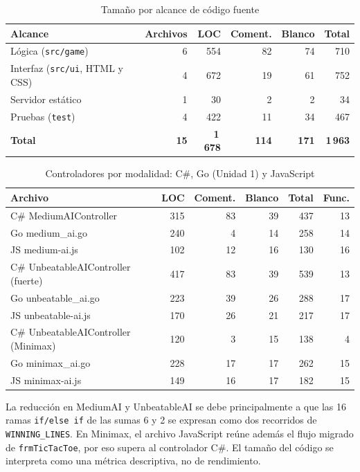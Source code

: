 \documentclass[12pt,a4paper]{article}
\begin{document}
\begin{table}[H]
\centering\small
\caption{Tamaño por alcance de código fuente}
\begin{tabular}{lrrrrr}
\toprule Alcance & Archivos & LOC & Coment. & Blanco & Total\\\midrule
Lógica (\texttt{src/game}) & 6 & 554 & 82 & 74 & 710\\
Interfaz (\texttt{src/ui}, HTML y CSS) & 4 & 672 & 19 & 61 & 752\\
Servidor estático & 1 & 30 & 2 & 2 & 34\\
Pruebas (\texttt{test}) & 4 & 422 & 11 & 34 & 467\\
\textbf{Total} & \textbf{15} & \textbf{1\,678} & \textbf{114} & \textbf{171} & \textbf{1\,963}\\
\bottomrule
\end{tabular}
\end{table}

\begin{table}[H]
\centering\small
\caption{Controladores por modalidad: C\#, Go (Unidad 1) y JavaScript}
\begin{tabular}{lrrrrr}
\toprule Archivo & LOC & Coment. & Blanco & Total & Func.\\\midrule
C\# MediumAIController & 315 & 83 & 39 & 437 & 13\\
Go medium\_ai.go & 240 & 4 & 14 & 258 & 14\\
JS medium-ai.js & 102 & 12 & 16 & 130 & 16\\\midrule
C\# UnbeatableAIController (fuerte) & 417 & 83 & 39 & 539 & 13\\
Go unbeatable\_ai.go & 223 & 39 & 26 & 288 & 17\\
JS unbeatable-ai.js & 170 & 26 & 21 & 217 & 17\\\midrule
C\# UnbeatableAIController (Minimax) & 120 & 3 & 15 & 138 & 4\\
Go minimax\_ai.go & 228 & 17 & 17 & 262 & 15\\
JS minimax-ai.js & 149 & 16 & 17 & 182 & 15\\
\bottomrule
\end{tabular}
\end{table}
La reducción en MediumAI y UnbeatableAI se debe principalmente a que las 16 ramas
\texttt{if/else if} de las sumas 6 y 2 se expresan como dos recorridos de
\texttt{WINNING\_LINES}. En Minimax, el archivo JavaScript reúne además el flujo
migrado de \texttt{frmTicTacToe}, por eso supera al controlador C\#. El tamaño
del código se interpreta como una métrica descriptiva, no de rendimiento.
\end{document}
